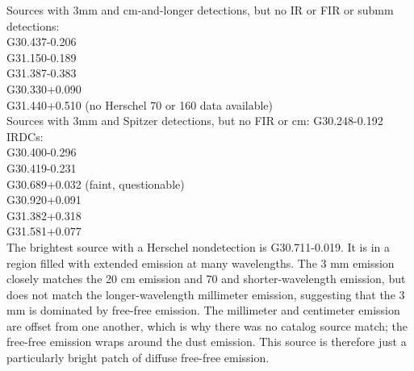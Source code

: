 \documentclass[twocolumn]{aastex62}
\begin{document}
Sources with 3mm and cm-and-longer detections, but no IR or FIR or submm detections:\\
G30.437-0.206 \\
G31.150-0.189 \\
G31.387-0.383 \\
G30.330+0.090 \\
G31.440+0.510 (no Herschel 70 \um or 160 \um data available) \\


Sources with 3mm and Spitzer detections, but no FIR or cm:
G30.248-0.192 \\

IRDCs:\\
G30.400-0.296 \\
G30.419-0.231 \\
G30.689+0.032 (faint, questionable)\\
G30.920+0.091 \\
G31.382+0.318 \\
G31.581+0.077 \\





The brightest source with a Herschel nondetection is G30.711-0.019.  It is in a
region filled with extended emission at many wavelengths.  The 3 mm emission
closely matches the 20 cm emission and 70 \um and shorter-wavelength emission,
but does not match the longer-wavelength millimeter emission, suggesting that
the 3 mm is dominated by free-free emission.  The millimeter and centimeter
emission are offset from one another, which is why there was no catalog source
match; the free-free emission wraps around the dust emission.  This source is
therefore just a particularly bright patch of diffuse free-free emission.
\end{document}
